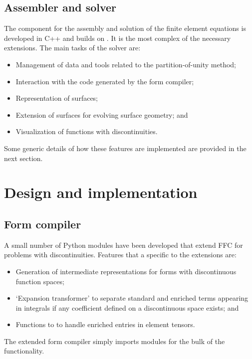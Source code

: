 \subsection{Assembler and solver}
%
The component for the assembly and solution of the finite element
equations is developed in C++ and builds on \dolfin{}. It is the most
complex of the necessary extensions. The main tasks of the solver are:
%
\begin{itemize}
  \item Management of data and tools related to the partition-of-unity
  method;
  \item Interaction with the code generated by the form compiler;
  \item Representation of surfaces;
  \item Extension of surfaces for evolving surface geometry; and
  \item Visualization of functions with discontinuities.
\end{itemize}
%
Some generic details of how these features are implemented are provided
in the next section.

\section{Design and implementation}
\subsection{Form compiler}

A small number of Python modules have been developed that extend FFC for
problems with discontinuities. Features that a specific to the extensions
are:
%
\begin{itemize}
  \item Generation of intermediate representations for forms with discontinuous
  function spaces;

  \item `Expansion transformer' to separate standard and enriched terms
  appearing in integrals if any coefficient defined on a discontinuous space
  exists; and

  \item Functions to to handle enriched entries in element tensors.
\end{itemize}
%
The extended form compiler simply imports \ffc{} modules for the
bulk of the functionality.
